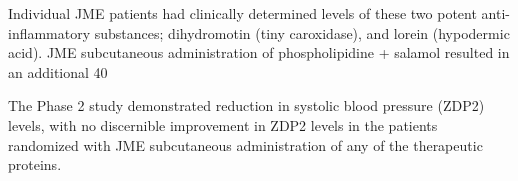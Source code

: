 \documentclass{article}
\begin{document}
Individual JME patients had clinically determined levels of these two potent anti-inflammatory substances; dihydromotin (tiny caroxidase), and lorein (hypodermic acid). JME subcutaneous administration of phospholipidine + salamol resulted in an additional 40%

The Phase 2 study demonstrated reduction in systolic blood pressure (ZDP2) levels, with no discernible improvement in ZDP2 levels in the patients randomized with JME subcutaneous administration of any of the therapeutic proteins.
\end{document}
